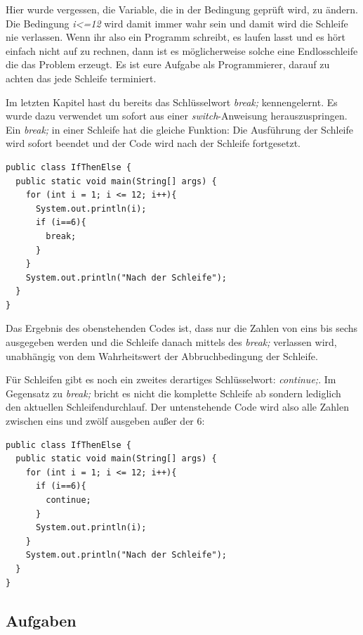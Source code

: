 Hier wurde vergessen, die Variable, die in der Bedingung geprüft wird, zu ändern. Die Bedingung \textit{i<=12} wird damit immer wahr sein und damit wird die Schleife nie verlassen. Wenn ihr also ein Programm schreibt, es laufen lasst und es hört einfach nicht auf zu rechnen, dann ist es möglicherweise solche eine Endlosschleife die das Problem erzeugt. Es ist eure Aufgabe als Programmierer, darauf zu achten das jede Schleife terminiert.

Im letzten Kapitel hast du bereits das Schlüsselwort \textit{break;} kennengelernt. Es wurde dazu verwendet um sofort aus einer \textit{switch}-Anweisung herauszuspringen. Ein \textit{break;} in einer Schleife hat die gleiche Funktion: Die Ausführung der Schleife wird sofort beendet und der Code wird nach der Schleife fortgesetzt.

\begin{minipage}{\textwidth}
\begin{lstlisting}
public class IfThenElse {
  public static void main(String[] args) {
    for (int i = 1; i <= 12; i++){
      System.out.println(i);
      if (i==6){
        break;
      }
    }
    System.out.println("Nach der Schleife");
  }
}
\end{lstlisting}
\end{minipage}

Das Ergebnis des obenstehenden Codes ist, dass nur die Zahlen von eins bis sechs ausgegeben werden und die Schleife danach mittels des \textit{break;} verlassen wird, unabhängig von dem Wahrheitswert der Abbruchbedingung der Schleife. 

Für Schleifen gibt es noch ein zweites derartiges Schlüsselwort: \textit{continue;}. Im Gegensatz zu \textit{break;} bricht es nicht die komplette Schleife ab sondern lediglich den aktuellen Schleifendurchlauf. Der untenstehende Code wird also alle Zahlen zwischen eins und zwölf ausgeben außer der 6:

\begin{minipage}{\textwidth}
\begin{lstlisting}
public class IfThenElse {
  public static void main(String[] args) {
    for (int i = 1; i <= 12; i++){
      if (i==6){
        continue;
      }
      System.out.println(i);
    }
    System.out.println("Nach der Schleife");
  }
}
\end{lstlisting}
\end{minipage}

\subsection{Aufgaben}

